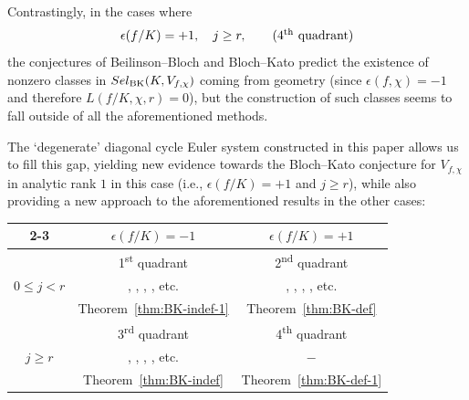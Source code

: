 \documentclass[10pt,letterpaper]{amsart}
\theoremstyle{plain}
\theoremstyle{definition}
\theoremstyle{definition}
\theoremstyle{plain}
\theoremstyle{plain}
\theoremstyle{plain}
\theoremstyle{remark}
\numberwithin{equation}{section}
\newcommand{\Sel}{Sel}
\newcommand{\ts}{\textsuperscript}
\def\Sel{{\rm Sel}}
\begin{document}
{Contrastingly, in the cases where
\begin{equation}\label{eq:4}
\epsilon(f/K)=+1,\quad j\geq r,\tag{4\ts{th} quadrant}
\end{equation} 
the conjectures of Beilinson--Bloch and Bloch--Kato  predict the existence of nonzero classes in $\Sel_{\mathrm{BK}}(K,V_{f,\chi})$ coming from geometry (since $\epsilon(f,\chi)=-1$ and therefore $L(f/K,\chi,r)=0$), but the construction of such classes seems to fall outside of all the aforementioned methods. 
%
%

The `degenerate' diagonal cycle 
 Euler system constructed in this paper allows us to fill this gap, yielding new evidence towards the Bloch--Kato conjecture for $V_{f,\chi}$ in analytic rank $1$ in this case (i.e., $\epsilon(f/K)=+1$ and $j\geq r$), while also providing a new approach 
to the aforementioned results in the other cases: 
\vspace{5pt}

\begin{center}
\begin{tabular}{c|c|c|}
\cline{2-3}
  & $\epsilon(f/K)=-1$ & $\epsilon(f/K)=+1$ \\
 \hline
\multicolumn{1}{|c}{} & \multicolumn{1}{|c}{1\ts{st} quadrant} & \multicolumn{1}{|c|}{2\ts{nd} quadrant} \\ 
\multicolumn{1}{|c}{$0\leq j<r$} & \multicolumn{1}{|c}{ \cite{kol88}, \cite{BD-crelle}, \cite{Tian-PhD}, \cite{nekovar-CM}, etc.} & \multicolumn{1}{|c|}{\cite{bdIMC}, \cite{ChHs2}, \cite{KLZ}, \cite{KLZ}, etc.} \\ 
\multicolumn{1}{|c}{} & \multicolumn{1}{|c}{Theorem~\ref{thm:BK-indef-1}} & \multicolumn{1}{|c|}{Theorem~\ref{thm:BK-def}} \\
 \hline
\multicolumn{1}{|c}{} & \multicolumn{1}{|c}{3\ts{rd} quadrant} & \multicolumn{1}{|c|}{4\ts{th} quadrant} \\ 
\multicolumn{1}{|c}{$j\geq r$} & \multicolumn{1}{|c}{\cite{cas-hsieh1}, \cite{cas-2var}, \cite{Magr}, \cite{kobayashi-GHC}, etc.} & \multicolumn{1}{|c|}{$-$} \\ 
\multicolumn{1}{|c}{} & \multicolumn{1}{|c}{Theorem~\ref{thm:BK-indef}} & \multicolumn{1}{|c|}{Theorem~\ref{thm:BK-def-1}} \\
\hline
\end{tabular}
\end{center}

}
\end{document}
